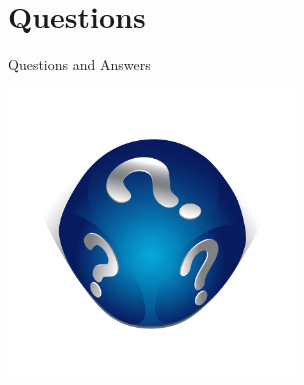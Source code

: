 \documentclass{beamer}
\begin{document}
\section{Questions}
\begin{frame}{Questions and Answers}
\begin{center}
\includegraphics[width=3in]{includes/cube_question}
\end{center}
\end{frame}
\end{document}

